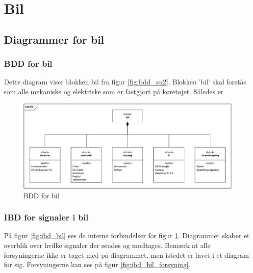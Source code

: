 \section{Bil}

\subsection{Diagrammer for bil}

\subsubsection{BDD for bil} %

Dette diagram viser blokken bil fra figur \ref{fig:bdd_au2}. Blokken 'bil' skal forstås som alle mekaniske og elektriske som er fastgjort på køretøjet. Således er 

\begin{figure}[h]
\centering
\includegraphics[width=\textwidth]{../fig/diagrammer/bil/bdd_bil.pdf}
\caption{BDD for bil}
\label{fig:bdd_bil}
\end{figure}
\clearpage

\subsubsection{IBD for signaler i bil}

På figur \ref{fig:ibd_bil} ses de interne forbindelser for figur \ref{fig:bdd_bil}. Diagrammet skaber et overblik over hvilke signaler der sendes og modtages. Bemærk at alle forsyningerne ikke er taget med på diagrammet, men istedet er lavet i et diagram for sig. Forsyningerne kan ses på figur \ref{fig:ibd_bil_forsyning}.

